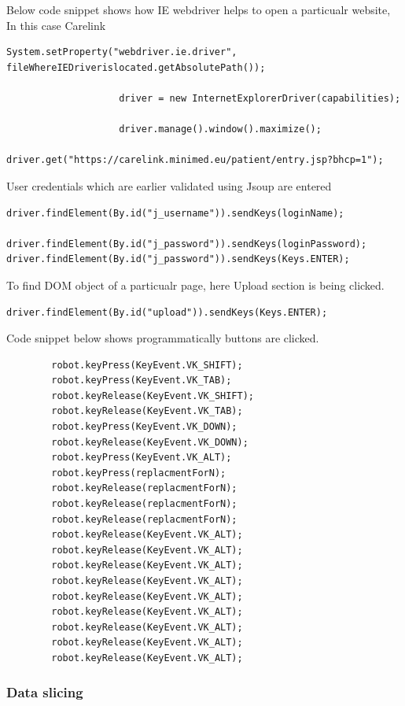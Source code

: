 \documentclass[article,type=msc,colorback,accentcolor=tud9c,twoside,11pt]{tudthesis}
\begin{document}
Below code snippet shows how IE webdriver helps to open a particualr website, In this case Carelink
\begin{lstlisting}
System.setProperty("webdriver.ie.driver", fileWhereIEDriverislocated.getAbsolutePath());

					driver = new InternetExplorerDriver(capabilities);

					driver.manage().window().maximize();
					driver.get("https://carelink.minimed.eu/patient/entry.jsp?bhcp=1");
\end{lstlisting}
User credentials which are earlier validated using Jsoup are entered
\begin{lstlisting}
driver.findElement(By.id("j_username")).sendKeys(loginName);
				driver.findElement(By.id("j_password")).sendKeys(loginPassword);
driver.findElement(By.id("j_password")).sendKeys(Keys.ENTER);
\end{lstlisting}
To find DOM object of a particualr page, here Upload section is being clicked.
\begin{lstlisting}
driver.findElement(By.id("upload")).sendKeys(Keys.ENTER);
\end{lstlisting}
 Code snippet below shows programmatically buttons are clicked.
\begin{lstlisting}
		robot.keyPress(KeyEvent.VK_SHIFT);
		robot.keyPress(KeyEvent.VK_TAB);
		robot.keyRelease(KeyEvent.VK_SHIFT);
		robot.keyRelease(KeyEvent.VK_TAB);
		robot.keyPress(KeyEvent.VK_DOWN);
		robot.keyRelease(KeyEvent.VK_DOWN);
		robot.keyPress(KeyEvent.VK_ALT);
		robot.keyPress(replacmentForN);
		robot.keyRelease(replacmentForN);
		robot.keyRelease(replacmentForN);
		robot.keyRelease(replacmentForN);
		robot.keyRelease(KeyEvent.VK_ALT);
		robot.keyRelease(KeyEvent.VK_ALT);
		robot.keyRelease(KeyEvent.VK_ALT);
		robot.keyRelease(KeyEvent.VK_ALT);
		robot.keyRelease(KeyEvent.VK_ALT);
		robot.keyRelease(KeyEvent.VK_ALT);
		robot.keyRelease(KeyEvent.VK_ALT);
		robot.keyRelease(KeyEvent.VK_ALT);
		robot.keyRelease(KeyEvent.VK_ALT);
\end{lstlisting}


\subsubsection{Data slicing}
\end{document}

